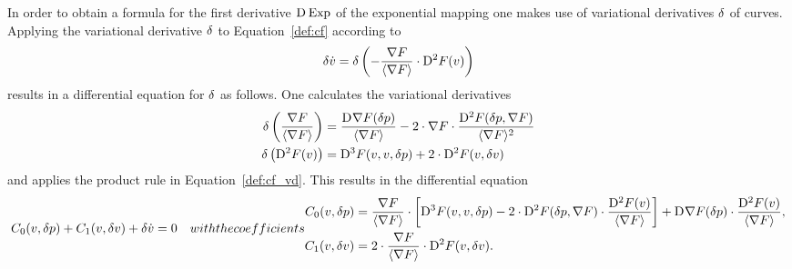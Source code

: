 In order to obtain a formula for the first derivative $ \mathrm{D}^{  } \operatorname{Exp}  $
of the exponential mapping one makes use
of variational derivatives $ \delta $ of curves.
Applying the variational derivative $ \delta $
to Equation~\eqref{def:cf} according to
\begin{align}
    \delta \dot{ v }  =
    \delta \left(
        -\frac{ \nabla F }{ \langle  \nabla F  \rangle }  \cdot
        \mathrm{D}^{ 2 }F( v ) \right)
    \label{def:cf_vd}
\end{align}
results in a differential equation for $ \delta $ as follows.
One calculates the variational derivatives
\begin{subequations}
    \begin{align}
    \delta \left( \frac{ \nabla F  }{ \langle  \nabla F   \rangle } \right)
    &=
    \frac{ \mathrm{D}^{  } \nabla F  ( \delta p ) }{ \langle  \nabla F   \rangle }  -
    2 \cdot \nabla F  \cdot
    \frac{ \mathrm{D}^{  2  } F ( \delta p, \nabla F  ) }{ \langle  \nabla F   \rangle^2 }
    \\
    \delta\left( \mathrm{D}^{  2  } F ( v ) \right)
    &=
    \mathrm{D}^{  3  } F ( v, v, \delta p )  +
    2 \cdot \mathrm{D}^{  2  } F ( v, \delta v )
    \end{align}
\end{subequations}
and applies the product rule in Equation~\eqref{def:cf_vd}.
This results in the differential equation
\begin{subequations}
    \label{def:cf_vd_dgl}
    \begin{align}
        C_0( v, \vardiff p )  +  C_1( v, \vardiff v )  +  \vardiff \dot{ v }
        &=
        0
        \label{def:cf_vd_dgl:a}
    \end{align}
    with the coefficients
    \begin{align}
        C_0( v, \vardiff p )
        &=
        \frac{ \grad{F} }{ \skaq{ \grad{F} } } \mult
        \left[  \diff{3}{F}( v, v, \vardiff p )  -
        2 \mult \diff{2}{F}( \vardiff p, \grad{F} ) \mult
        \frac{ \diff{2}{F}( v ) }{ \skaq{\grad{F}} }  \right]  +
        \diff{}{\grad{F}}( \vardiff p ) \mult
        \frac{ \diff{2}{F}( v ) }{ \skaq{\grad{F}} } ,
        \label{def:cf_vd_dgl:b}
        \\
        C_1( v, \vardiff v )
        &=
        2 \mult \frac{ \grad{F} }{ \skaq{ \grad{F} } }  \mult
        \diff{2}{F}( v, \vardiff v ) .
        \label{def:cf_vd_dgl:c}
    \end{align}
\end{subequations}


